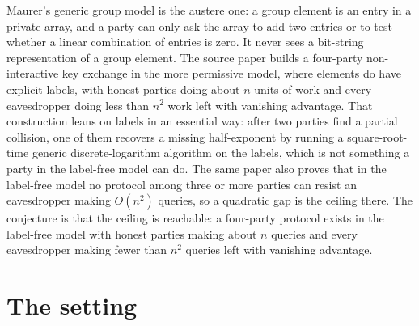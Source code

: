 \documentclass{conjura-conjecture}
\begin{document}

\vspace{0.4em}

\begin{informalconjecture}
Maurer's generic group model is the austere one: a group element is an
entry in a private array, and a party can only ask the array to add two
entries or to test whether a linear combination of entries is zero. It
never sees a bit-string representation of a group element. The source
paper builds a four-party non-interactive key exchange in the more
permissive model, where elements do have explicit labels, with honest
parties doing about $n$ units of work and every eavesdropper doing less
than $n^{2}$ work left with vanishing advantage. That construction leans
on labels in an essential way: after two parties find a partial
collision, one of them recovers a missing half-exponent by running a
square-root-time generic discrete-logarithm algorithm on the labels,
which is not something a party in the label-free model can do. The same
paper also proves that in the label-free model no protocol among three
or more parties can resist an eavesdropper making $O(n^{2})$ queries, so
a quadratic gap is the ceiling there. The conjecture is that the ceiling
is reachable: a four-party protocol exists in the label-free model with
honest parties making about $n$ queries and every eavesdropper making
fewer than $n^{2}$ queries left with vanishing advantage.
\end{informalconjecture}

\section{The setting}\label{sec:setting}
\end{document}
